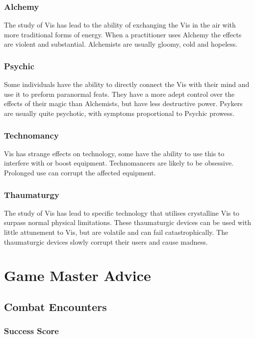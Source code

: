 \documentclass[a4paper,12pt,oneside]{book}
\begin{document}
            \subsection{Alchemy}
                The study of Vis has lead to the ability of exchanging the Vis in the air with more traditional forms of energy. When a practitioner uses Alchemy the effects are violent and substantial. Alchemists are usually gloomy, cold and hopeless.

            \subsection{Psychic}
                Some individuals have the ability to directly connect the Vis with their mind and use it to preform paranormal feats. They have a more adept control over the effects of their magic than Alchemists, but have less destructive power. Psykers are usually quite psychotic, with symptoms proportional to Psychic prowess.

            \subsection{Technomancy}
                Vis has strange effects on technology, some have the ability to use this to interfere with or boost equipment. Technomancers are likely to be obsessive. Prolonged use can corrupt the affected equipment.

            \subsection{Thaumaturgy}
                The study of Vis has lead to specific technology that utilises crystalline Vis to surpass normal physical limitations. These thaumaturgic devices can be used with little attunement to Vis, but are volatile and can fail catastrophically. The thaumaturgic devices slowly corrupt their users and cause madness.

    \chapter{Game Master Advice}
        \section{Combat Encounters}
            \subsection{Success Score}
\end{document}
